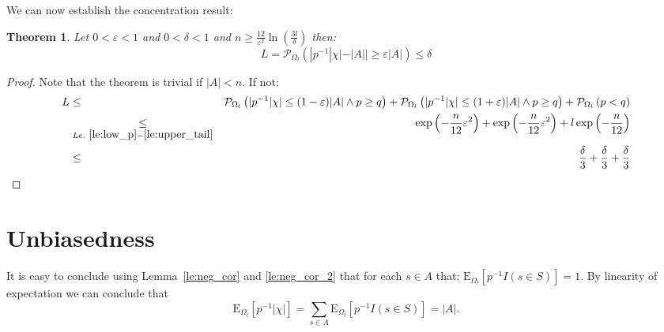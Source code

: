 \documentclass{article}
\newcommand{\prob}{\mathcal P}
\newcommand{\expectation}{\mathrm{E}}
\newcommand{\eps}{\varepsilon}
\newtheorem{theorem}{Theorem}
\theoremstyle{definition}
\begin{document}
We can now establish the concentration result:
\begin{theorem}
Let $0 < \eps < 1$ and $0 < \delta < 1$ and $n \geq \frac{12}{\eps^2} \ln\left(\frac{3l}{\delta}\right)$ then:
\[
  L = \prob_{\Omega_l} \left( | p^{-1} |\chi| - |A| | \geq \eps |A| \right) \leq \delta
\]
\end{theorem}
\begin{proof}
Note that the theorem is trivial if $|A| < n$. If not:
\begin{eqnarray*}
  L & \leq & \prob_{\Omega_l} \left( | p^{-1} |\chi| \leq (1-\eps) |A| \wedge p \geq q \right) + 
    \prob_{\Omega_l} \left( | p^{-1} |\chi| \leq (1+\eps) |A| \wedge p \geq q \right) + 
    \prob_{\Omega_l} \left( p < q \right) \\
    & \underset{Le.~\ref{le:low_p}-\ref{le:upper_tail}}{\leq} &
    \exp\left( - \frac{n}{12} \eps^2 \right)  + \exp\left( - \frac{n}{12} \eps^2 \right) + l \exp\left( - \frac{n}{12} \right) \\
    & \leq & \frac{\delta}{3} + \frac{\delta}{3} + \frac{\delta}{3} 
\end{eqnarray*}
\end{proof}

\section{Unbiasedness}
It is easy to conclude using Lemma~\ref{le:neg_cor} and \ref{le:neg_cor_2} that for each $s \in A$ that:
$\expectation_{\Omega_l} [ p^{-1} I(s \in S) ] = 1$.
By linearity of expectation we can conclude that
\[
  \expectation_{\Omega_l} [ p^{-1} |\chi| ] = \sum_{s \in A} \expectation_{\Omega_l} [ p^{-1} I(s \in S) ] = |A| \textrm{.}
\]
\end{document}
